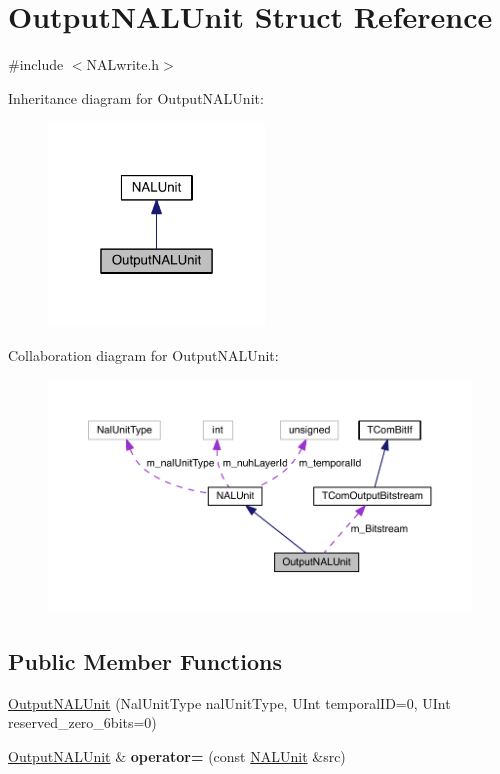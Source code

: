 \hypertarget{struct_output_n_a_l_unit}{}\section{Output\+N\+A\+L\+Unit Struct Reference}
\label{struct_output_n_a_l_unit}


{\ttfamily \#include $<$N\+A\+Lwrite.\+h$>$}



Inheritance diagram for Output\+N\+A\+L\+Unit\+:
\nopagebreak
\begin{figure}[H]
\begin{center}
\leavevmode
\includegraphics[width=163pt]{d8/d8d/struct_output_n_a_l_unit__inherit__graph}
\end{center}
\end{figure}


Collaboration diagram for Output\+N\+A\+L\+Unit\+:
\nopagebreak
\begin{figure}[H]
\begin{center}
\leavevmode
\includegraphics[width=350pt]{d1/d24/struct_output_n_a_l_unit__coll__graph}
\end{center}
\end{figure}
\subsection*{Public Member Functions}
\begin{DoxyCompactItemize}
\item 
\hyperlink{struct_output_n_a_l_unit_a7dffded9144a8059e39113401d23703f}{Output\+N\+A\+L\+Unit} (Nal\+Unit\+Type nal\+Unit\+Type, U\+Int temporal\+ID=0, U\+Int reserved\+\_\+zero\+\_\+6bits=0)
\item 
\mbox{\label{struct_output_n_a_l_unit_a0c7e9355cc4f73b519813628b0ef69e6}} 
\hyperlink{struct_output_n_a_l_unit}{Output\+N\+A\+L\+Unit} \& {\bfseries operator=} (const \hyperlink{struct_n_a_l_unit}{N\+A\+L\+Unit} \&src)
\end{DoxyCompactItemize}
